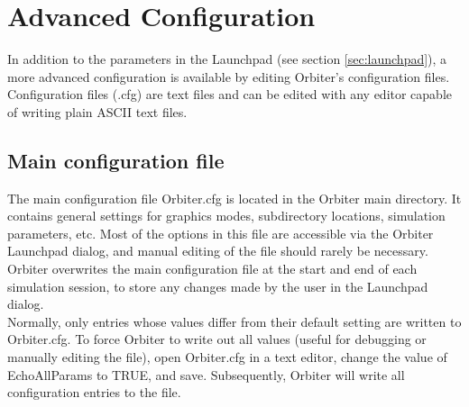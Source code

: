 \documentclass[Orbiter User Manual.tex]{subfiles}
\begin{document}
\section{Advanced Configuration}
In addition to the parameters in the Launchpad (see section \ref{sec:launchpad}), a more advanced configuration is available by editing Orbiter's configuration files. Configuration files (.cfg) are text files and can be edited with any editor capable of writing plain ASCII text files.


\subsection{Main configuration file}
The main configuration file Orbiter.cfg is located in the Orbiter main directory. It contains general settings for graphics modes, subdirectory locations, simulation parameters, etc. Most of the options in this file are accessible via the Orbiter Launchpad dialog, and manual editing of the file should rarely be necessary.\\
Orbiter overwrites the main configuration file at the start and end of each simulation session, to store any changes made by the user in the Launchpad dialog.\\
Normally, only entries whose values differ from their default setting are written to Orbiter.cfg. To force Orbiter to write out all values (useful for debugging or manually editing the file), open Orbiter.cfg in a text editor, change the value of EchoAllParams to TRUE, and save. Subsequently, Orbiter will write all configuration entries to the file.
\end{document}
